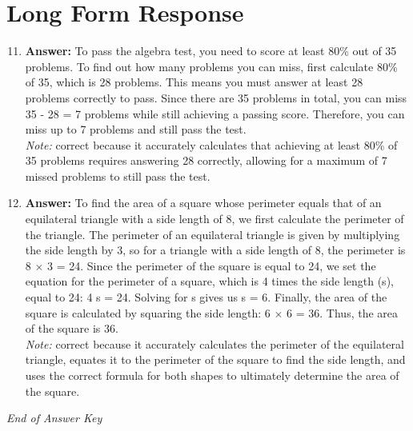 \documentclass[12pt]{article}
\begin{document}
\section*{Long Form Response}
\begin{enumerate}[label=\arabic*.]
\setcounter{enumi}{10}
\item \textbf{Answer:} To pass the algebra test, you need to score at least 80\% out of 35 problems. To find out how many problems you can miss, first calculate 80\% of 35, which is 28 problems. This means you must answer at least 28 problems correctly to pass. Since there are 35 problems in total, you can miss 35 - 28 = 7 problems while still achieving a passing score. Therefore, you can miss up to 7 problems and still pass the test.
\\ \textit{Note:} correct because it accurately calculates that achieving at least 80\% of 35 problems requires answering 28 correctly, allowing for a maximum of 7 missed problems to still pass the test.
\item \textbf{Answer:} To find the area of a square whose perimeter equals that of an equilateral triangle with a side length of 8, we first calculate the perimeter of the triangle. The perimeter of an equilateral triangle is given by multiplying the side length by 3, so for a triangle with a side length of 8, the perimeter is 8 \ensuremath{\times} 3 = 24. Since the perimeter of the square is equal to 24, we set the equation for the perimeter of a square, which is 4 times the side length (s), equal to 24: 4 s = 24. Solving for s gives us s = 6. Finally, the area of the square is calculated by squaring the side length: 6 \ensuremath{\times} 6 = 36. Thus, the area of the square is 36.
\\ \textit{Note:} correct because it accurately calculates the perimeter of the equilateral triangle, equates it to the perimeter of the square to find the side length, and uses the correct formula for both shapes to ultimately determine the area of the square.
\end{enumerate}

\vfill
\noindent\textit{End of Answer Key}
\end{document}
